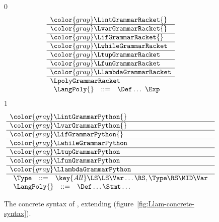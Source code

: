 \documentclass[7x10]{TimesAPriori_MIT}%
\newcommand{\gray}[1]{{\color{gray} #1}}
\def\racketEd{0}
\def\pythonEd{1}
\def\edition{0}
\numberwithin{theorem}{chapter}
\numberwithin{definition}{chapter}
\numberwithin{equation}{chapter}
\begin{document}
\newcommand{\LpolyGrammarPython}{
\begin{array}{lcl}
  \Type &::=& \key{All}\LS \LS\Var\ldots\RS,\Type\RS \MID \Var 
\end{array}
}

\newcommand{\LpolyASTPython}{
\begin{array}{lcl}
  \Type &::=& \key{AllType}\LP\LS\Var\ldots\RS, \Type\RP
    \MID \key{GenericVar}\LP\Var\RP
\end{array}
}  


\begin{figure}[tp]
\centering
\begin{tcolorbox}[colback=white]
\footnotesize
\if\edition\racketEd
\[
\begin{array}{l}
  \gray{\LintGrammarRacket{}} \\ \hline
  \gray{\LvarGrammarRacket{}} \\ \hline
  \gray{\LifGrammarRacket{}} \\ \hline
  \gray{\LwhileGrammarRacket} \\ \hline
  \gray{\LtupGrammarRacket} \\   \hline
  \gray{\LfunGrammarRacket} \\   \hline
  \gray{\LlambdaGrammarRacket} \\ \hline
  \LpolyGrammarRacket \\
\begin{array}{lcl}
  \LangPoly{} &::=& \Def \ldots ~ \Exp
\end{array}
\end{array}
\]
\fi
\if\edition\pythonEd
\[
\begin{array}{l}
  \gray{\LintGrammarPython{}} \\ \hline
  \gray{\LvarGrammarPython{}} \\ \hline
  \gray{\LifGrammarPython{}} \\ \hline
  \gray{\LwhileGrammarPython} \\ \hline
  \gray{\LtupGrammarPython} \\   \hline
  \gray{\LfunGrammarPython} \\   \hline
  \gray{\LlambdaGrammarPython} \\\hline
  \LpolyGrammarPython \\
  \begin{array}{lcl}
    \LangPoly{} &::=& \Def\ldots \Stmt\ldots
  \end{array}
\end{array}
\]
\fi
\end{tcolorbox}

\caption{The concrete syntax of \LangPoly{}, extending \LangLam{}
    (figure~\ref{fig:Llam-concrete-syntax}).}
\label{fig:Lpoly-concrete-syntax}
\end{figure}
\end{document}
